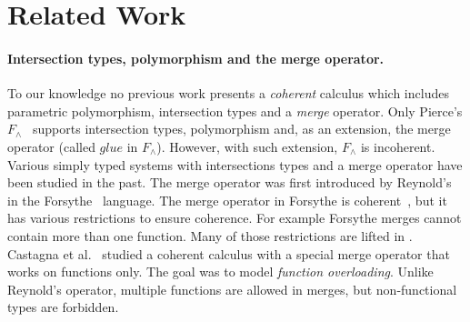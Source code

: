 \section{Related Work}
\label{sec:related-work}
\paragraph{Intersection types, polymorphism and the merge operator.}
To our knowledge no previous work presents a \emph{coherent} calculus
which includes parametric polymorphism, intersection types and a
\emph{merge} operator. Only Pierce's
$F_\wedge$~\cite{pierce1991programming2}
supports intersection types, polymorphism and, as an extension,
the merge operator (called $glue$ in $F_\wedge$). 
However, with such extension, $F_\wedge$ is incoherent. 
Various simply typed systems with 
intersections types and a merge operator have been studied in the past.
The merge operator was first introduced 
by Reynold's in the Forsythe~\cite{reynolds1997design}
language. The merge operator in Forsythe is coherent~\cite{reynolds1991coherence}, but it
has various restrictions to ensure coherence. For example Forsythe merges cannot contain more than one function.
Many of those restrictions are lifted in \name. 
Castagna et al.~\cite{castagna1995calculus} studied a coherent calculus with a
special merge operator that works on functions only. The goal was to model
\emph{function overloading}. Unlike Reynold's operator, multiple 
functions are allowed in merges, but non-functional types are
forbidden.
\begin{comment}
Concerning simply-typed systems, the oldest work dates back to the 1980s,
when Reynolds invented Forsythe~\cite{reynolds1997design}, with his
merge-like operator being noted as $p_1, p_2$.
Even though his calculus was proven to be coherent~\cite{reynolds1991coherence},
it uses a form of biased choice by having precedence in typing rules for intersections.
His system is also arguably more restrictive than ours since it forbids, for instance,
the merge of two functions.

Pierce~\cite{pierce1991programming2} made a comprehensive review
of coherence, but he was unable to prove it for his $F_\wedge$ calculus. 
He introduced a primitive $\code{glue}$ function as
a language extension which corresponds to our merge operator. 
However, users can ``glue'' two arbitrary values, which may lead to incoherence.

Castagna et al.~\cite{Castagna92calculus} proposed $\lamint$ to study
the overloading problem for functions. 
They have a special merge for functions and also a special function application
for these merges.
Their calculus is coherent and they also employ well-formedness conditions on their 
(functional) merges. 
These conditions are incompatible with systems like ours -- which allow arbitrary
intersections -- and thus are hard to compare in terms of expressiveness.
This means that $\lamint$ accepts different functional merges than \name and 
vice-versa.
\end{comment}
